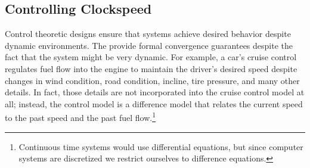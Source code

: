\subsection{Controlling Clockspeed}
\begin{figure}
  \subfloat[]
  {
    
    \label{fig:lavamd_control}
  }
 \label{fig:freq-control}
\end{figure}
Control theoretic designs ensure that systems achieve desired behavior
despite dynamic environments.  
The provide formal convergence guarantees despite the fact that the system might be very dynamic.
For example, a car's cruise control
regulates fuel flow into the engine to maintain the driver's desired
speed despite changes in wind condition, road condition, incline, tire
pressure, and many other details.  In fact, those details are not
incorporated into the cruise control model at all; instead, the
control model is a difference model that relates the current speed to
the past speed and the past fuel flow.\footnote{Continuous time
  systems would use differential equations, but since computer systems
  are discretized we restrict ourselves to difference equations.}

